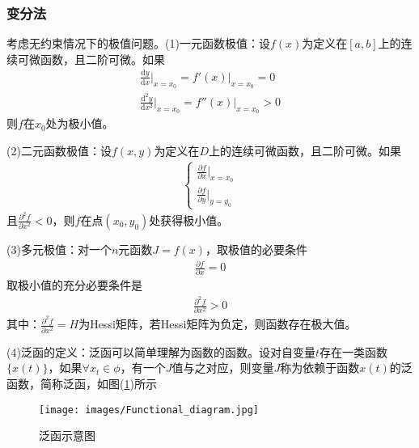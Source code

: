        \subsubsection{变分法}
            \par
            考虑无约束情况下的极值问题。(1)一元函数极值：设$f(x)$为定义在$[a,b]$上的连续可微函数，且二阶可微。如果
            \begin{align*}
            \frac{\mathrm{d}y}{\mathrm{d}x}\Big|_{x=x_0} = f'(x)|_{x=x_0} = 0\\
            \frac{\mathrm{d}^2y}{\mathrm{d}x^2}\Big|_{x=x_0} = f''(x)|_{x=x_0} > 0
            \end{align*}
            则$f$在$x_0$处为极小值。
            \par
            (2)二元函数极值：设$f(x,y)$为定义在$D$上的连续可微函数，且二阶可微。如果
            \begin{align*}
            \left\{
            \begin{aligned}
            \frac{\partial f}{\partial x} \Big|_{x = x_0}\\
            \frac{\partial f}{\partial y} \Big|_{y = y_0}
            \end{aligned}
            \right.
            \end{align*}
            且$\frac{\partial ^2f}{\partial x^2}<0$，则$f$在点$(x_0,y_0)$处获得极小值。
            \par
            (3)多元极值：对一个$n$元函数$J = f(x)$，取极值的必要条件
            \begin{align*}
            \frac{\partial f}{\partial x} = 0
            \end{align*}
            取极小值的充分必要条件是
            \begin{align*}
            \frac{\partial ^2f}{\partial x^2} > 0
            \end{align*}
            其中：$\frac{\partial ^2f}{\partial x^2} = H$为Hessi矩阵，若Hessi矩阵为负定，则函数存在极大值。
            \par
            (4)泛函的定义：泛函可以简单理解为函数的函数。设对自变量$t$存在一类函数$\{x(t)\}$，如果$\forall x_t\in \phi $，有一个$J$值与之对应，则变量$J$称为依赖于函数$x(t)$的泛函数，简称泛函，如图(\ref{fig:泛函示意图})所示
            \begin{figure}[H]
            \centering
            \texttt{[image: images/Functional\_diagram.jpg]}
            \caption{泛函示意图}
            \label{fig:泛函示意图}
            \end{figure}
